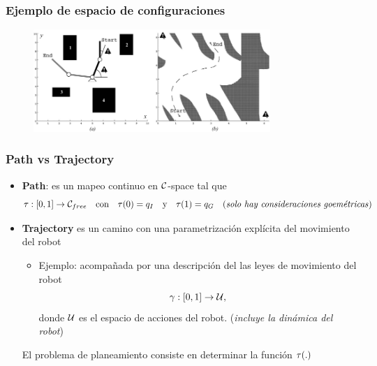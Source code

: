 \begin{frame}
	\frametitle{Ejemplo de espacio de configuraciones}
	
	\begin{figure}[!h]
		\includegraphics[width=0.8\textwidth]{images/configuration_space_manipulator.pdf}
	\end{figure}
	
\end{frame}

\begin{frame}
    \frametitle{Path vs Trajectory}
    
    \begin{itemize}
    \item {\bf Path}: es un mapeo continuo en $\mathcal{C}$-space tal que
        \begin{equation*}
            \tau : [0,1] \rightarrow \mathcal{C}_{free} \quad \text{con} \quad \tau(0) = q_{I} \quad \text{y} \quad  \tau(1) = q_{G} \quad \text{(\emph{solo hay consideraciones goemétricas})}
        \end{equation*} 
    \item {\bf Trajectory} es un camino con una parametrización explícita del movimiento del robot
    \begin{itemize}
        \item Ejemplo: acompañada por una descripción del las leyes de movimiento del robot
            \begin{equation*}
                \gamma : [0, 1] \rightarrow \mathcal{U},
            \end{equation*}
            donde $\mathcal{U}$ es el espacio de acciones del robot. (\emph{incluye la dinámica del robot})
        \end{itemize}
        \vspace{3em}
        \begin{center}
            \alert{El problema de planeamiento consiste en determinar la función $\tau(.)$}  
        \end{center}
    \end{itemize}
\end{frame}

